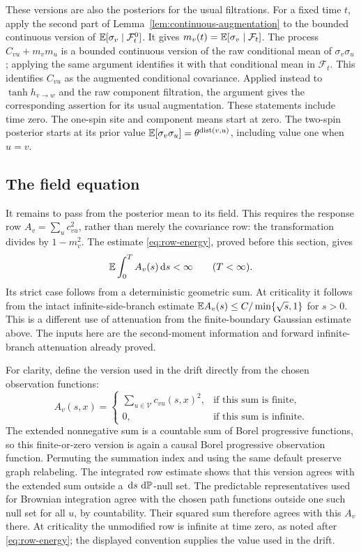 These versions are also the posteriors for the usual filtrations.
For a fixed time $t$, apply the second part of
Lemma~\ref{lem:continuous-augmentation} to the bounded continuous
version of $\mathbb E[\sigma_v\mid\mathcal F_t^0]$.  It gives
$m_v(t)=\mathbb E[\sigma_v\mid\mathcal F_t]$.  The process
$C_{vu}+m_vm_u$ is a bounded continuous version of the raw conditional
mean of $\sigma_v\sigma_u$; applying the same argument identifies
it with that conditional mean in $\mathcal F_t$.  This identifies
$C_{vu}$ as the augmented conditional covariance.  Applied instead
to $\tanh h_{v\to w}$ and the raw component filtration, the argument
gives the corresponding assertion for its usual augmentation.
These statements include time zero.  The one-spin site and component
means start at zero.  The two-spin posterior starts at its prior value
$\mathbb E[\sigma_v\sigma_u]=\theta^{\operatorname{dist}(v,u)}$, including value one when
$u=v$.

\subsection{The field equation}

It remains to pass from the posterior mean to its field.  This requires
the response row $A_v=\sum_u c_{vu}^2$, rather than merely the
covariance row: the transformation divides by $1-m_v^2$.  The
estimate \eqref{eq:row-energy}, proved before this section, gives
\[
 \mathbb E\int_0^T A_v(s)\,\mathrm d s<\infty
 \qquad(T<\infty).
\]
Its strict case follows from a deterministic geometric sum.  At
criticality it follows from the intact infinite-side-branch estimate
$\mathbb E A_v(s)\le C/\min\{\sqrt s,1\}$ for $s>0$.  This is a different
use of attenuation from the finite-boundary Gaussian estimate above.
The inputs here are the second-moment information and forward
infinite-branch attenuation already proved.

For clarity, define the version used in the drift directly from the
chosen observation functions:
\[
 A_v(s,x)=
 \begin{cases}
  \displaystyle\sum_{u\in\mathcal V}c_{vu}(s,x)^2,
      &\text{if this sum is finite},\\
  0,&\text{if this sum is infinite}.
 \end{cases}
\]
The extended nonnegative sum is a countable sum of Borel progressive
functions, so this finite-or-zero version is again a causal Borel
progressive observation function.  Permuting the summation index and
using the same default preserve graph relabeling.  The integrated row
estimate shows that this version agrees with the extended sum outside
a $\,\mathrm d s\,\,\mathrm d\mathbb P$-null set.  The predictable representatives used for
Brownian integration agree with the chosen path functions outside one
such null set for all $u$, by countability.  Their squared sum
therefore agrees with this $A_v$ there.  At criticality the unmodified
row is infinite at time zero, as noted after \eqref{eq:row-energy};
the displayed convention supplies the value used in the drift.

